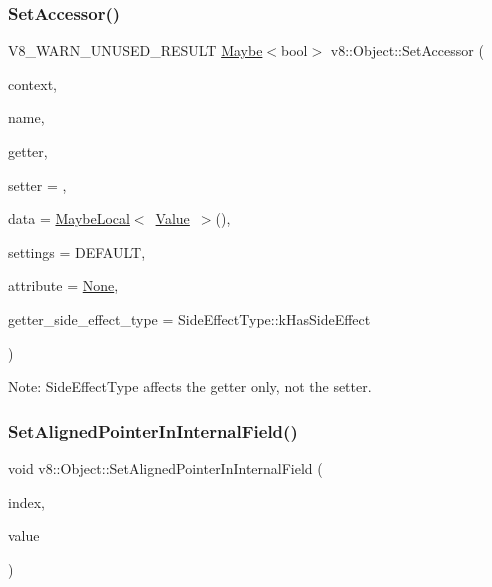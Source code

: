 \subsubsection{\texorpdfstring{Set\+Accessor()}{SetAccessor()}}
{\footnotesize\ttfamily V8\+\_\+\+W\+A\+R\+N\+\_\+\+U\+N\+U\+S\+E\+D\+\_\+\+R\+E\+S\+U\+LT \mbox{\hyperlink{classv8_1_1Maybe}{Maybe}}$<$bool$>$ v8\+::\+Object\+::\+Set\+Accessor (\begin{DoxyParamCaption}\item[{\mbox{\hyperlink{classv8_1_1Local}{Local}}$<$ \mbox{\hyperlink{classv8_1_1Context}{Context}} $>$}]{context,  }\item[{\mbox{\hyperlink{classv8_1_1Local}{Local}}$<$ \mbox{\hyperlink{classv8_1_1Name}{Name}} $>$}]{name,  }\item[{Accessor\+Name\+Getter\+Callback}]{getter,  }\item[{Accessor\+Name\+Setter\+Callback}]{setter = {},  }\item[{\mbox{\hyperlink{classv8_1_1MaybeLocal}{Maybe\+Local}}$<$ \mbox{\hyperlink{classv8_1_1Value}{Value}} $>$}]{data = {\ttfamily \mbox{\hyperlink{classv8_1_1MaybeLocal}{Maybe\+Local}}$<$~\mbox{\hyperlink{classv8_1_1Value}{Value}}~$>$()},  }\item[{\mbox{\hyperlink{namespacev8_a31d8355cb043d7d2dda3f4a52760b64e}{Access\+Control}}}]{settings = {\ttfamily DEFAULT},  }\item[{\mbox{\hyperlink{namespacev8_a05f25f935e108a1ea2d150e274602b87}{Property\+Attribute}}}]{attribute = {\ttfamily \mbox{\hyperlink{namespacev8_a05f25f935e108a1ea2d150e274602b87a7ab4d58719c33b3ea2dfaefa29b111df}{None}}},  }\item[{\mbox{\hyperlink{namespacev8_a29711319c2b9fc7716d65faee2f7b9cb}{Side\+Effect\+Type}}}]{getter\+\_\+side\+\_\+effect\+\_\+type = {\ttfamily SideEffectType\+:\+:kHasSideEffect} }\end{DoxyParamCaption})}

Note\+: Side\+Effect\+Type affects the getter only, not the setter. \mbox{\label{classv8_1_1Object_a0ccba69581f0b5e4e672bab90f26879b}} 
\subsubsection{\texorpdfstring{Set\+Aligned\+Pointer\+In\+Internal\+Field()}{SetAlignedPointerInInternalField()}}
{\footnotesize\ttfamily void v8\+::\+Object\+::\+Set\+Aligned\+Pointer\+In\+Internal\+Field (\begin{DoxyParamCaption}\item[{int}]{index,  }\item[{void $\ast$}]{value }\end{DoxyParamCaption})}

